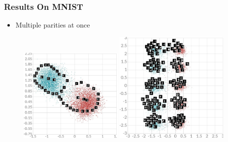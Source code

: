 \documentclass[10pt]{beamer}
\begin{document}
\begin{frame}
    \frametitle{Results On MNIST}
    \begin{itemize}
        \item Multiple parities at once
    \end{itemize}


    \begin{figure}[h]
        \begin{center}
            \includegraphics[width=0.45\textwidth]{../report/thesis_figures/mnist_cl_drlim.jpg}
            \vspace{1cm}
            \includegraphics[width=0.5\textwidth]{../report/thesis_figures/mnist_cl2d2.jpg}
        \end{center}
    \end{figure}
\end{frame}
\end{document}

